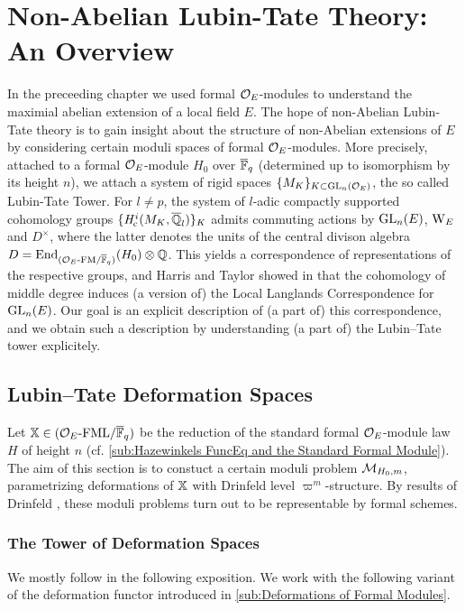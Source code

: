 \documentclass[../main.tex]{subfiles}
\begin{document}
\section{Non-Abelian Lubin-Tate Theory: An Overview} %
\label{sec:Non-Abelian Lubin-Tate Theory: An Overview}
In the preceeding chapter we used formal $\mathcal{O}_E$-modules to understand the 
maximial abelian extension of a local field $E$. The hope of non-Abelian Lubin-Tate
theory is to gain insight about the structure of non-Abelian extensions of $E$
by considering certain moduli spaces of formal $\mathcal{O}_E$-modules.
More precisely, attached to a formal $\mathcal{O}_E$-module $H_0$ over ${\overline {\mathbb{F}}_q}$
(determined
up to isomorphism by its height $n$), we attach a system of rigid spaces 
$\{M_K\}_{K \subset \operatorname{GL}_n(\mathcal{O}_E)}$, the so called Lubin-Tate Tower. For $l \neq p$, 
the system of $l$-adic compactly supported cohomology groups $\{\mathit H_{\mathrm{c}}^{i}(M_K,
\overline {\mathbb{Q}}_l)\}_K$ admits commuting actions by $\operatorname{GL}_n(E)$, $\mathrm W_E$ and $D^\times$,
where the latter denotes the units of the central divison algebra $D =
\operatorname{End}_{{({\mathcal{O}_E}\textnormal-\allowbreak\mathrm{FM}/{{\overline {\mathbb{F}}_q}})}}(H_0) \otimes \mathbb{Q}$. This yields a correspondence of 
representations of the respective groups, and Harris and Taylor showed in
\cite{HTShimura} that the cohomology of middle degree induces (a version of)
the Local Langlands Correspondence for $\operatorname{GL}_n(E)$. Our goal is an explicit
description of (a part of) this correspondence, and we obtain such a
description by understanding (a part of) the Lubin--Tate tower explicitely.

\subsection{Lubin--Tate Deformation Spaces} %
\label{sub:Lubin-Tate Deformation Spaces}
Let $\mathbb{X} \in {({\mathcal{O}_E}\textnormal-\allowbreak\mathrm{FML}/{{\overline{\mathbb{F}}_q}})}$ be the reduction of the standard formal
$\mathcal{O}_E$-module law $H$ of height $n$ (cf. \cref{sub:Hazewinkels FuncEq and the
Standard Formal Module}).
The aim of this section is to constuct a certain moduli problem $\mathcal{M}_{H_0, m}$,
parametrizing deformations of $\mathbb{X}$ with Drinfeld level $\varpi^m$-structure.
By results of Drinfeld \cite{drinfel1974elliptic}, these moduli problems turn
out to be representable by formal schemes.

\subsubsection{The Tower of Deformation Spaces} %
\label{ssub:The Tower of Deformation Spaces}
We mostly follow \cite[Chapter 2]{Strauch2008DefSp} in the following
exposition. 
 We work with the following variant of the deformation 
functor introduced in \cref{sub:Deformations of Formal Modules}.
\end{document}
